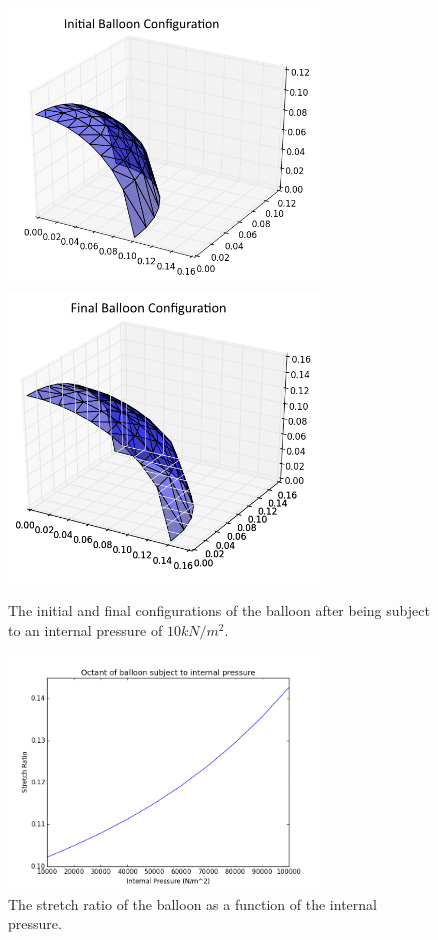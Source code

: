 \documentclass[]{spie}  %
\begin{document}
\begin{figure}[h]
	\centering
	\includegraphics[width=3.25in]{balloon_initial.png} \quad
	\includegraphics[width=3.25in]{balloon_final.png} 
	\caption{The initial and final configurations of the balloon after being subject to an internal pressure of $10 kN/m^2$.} 
	\label{fig: balloon deformation}
\end{figure}

\begin{figure}[h]
	\centering
	\includegraphics[width=3.25in]{pressure_vs_stretch.png}
	\caption{The stretch ratio of the balloon as a function of the internal pressure.} 
	\label{fig: pressure vs stretch}
\end{figure}
\end{document}

